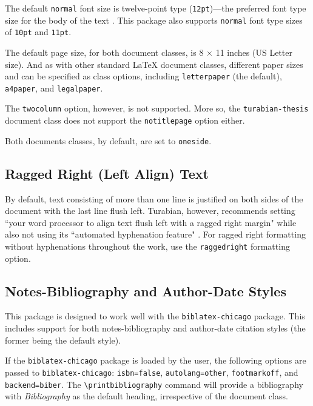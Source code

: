 \documentclass{article}
\begin{document}
The default \texttt{normal} font size is twelve-point type (\texttt{12pt})---the preferred font type size for the body of the text \autocite[373]{turabian_manual_2013}. This package also supports \texttt{normal} font type sizes of \texttt{10pt} and \texttt{11pt}.

The default page size, for both document classes, is 8 × 11 inches (US Letter size). And as with other standard \LaTeX{} document classes, different paper sizes and can be specified as class options, including \texttt{letterpaper} (the default), \texttt{a4paper}, and \texttt{legalpaper}.

The \texttt{twocolumn} option, however, is not supported. More so, the \texttt{turabian-thesis} document class does not support the \texttt{notitlepage} option either.

Both documents classes, by default, are set to \texttt{oneside}.


\subsection{Ragged Right (Left Align) Text}

%
By default, text consisting of more than one line is justified on both sides of the document with the last line flush left. Turabian, however, recommends setting ``your word processor to align text flush left with a ragged right margin" while also not using its ``automated hyphenation feature" \autocite[404]{turabian_manual_2013}. For ragged right formatting without hyphenations throughout the work, use the \texttt{raggedright} formatting option.


\subsection{Notes-Bibliography and Author-Date Styles}

This package is designed to work well with the \texttt{biblatex-chicago} package. This includes support for both notes-bibliography and author-date citation styles (the former being the default style).

If the \texttt{biblatex-chicago} package is loaded by the user, the following options are passed to \texttt{biblatex-chicago}: \texttt{isbn=false}, \texttt{autolang=other}, \texttt{footmarkoff}, and \texttt{backend=biber}. The \texttt{\textbackslash printbibliography} command will provide a bibliography with \emph{Bibliography} as the default heading, irrespective of the document class.
\end{document}
